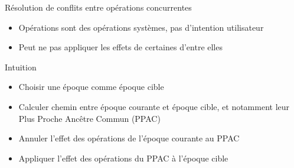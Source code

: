 \begin{frame}{Résolution de conflits entre opérations \ren concurrentes}
  \begin{itemize}
    \item Opérations \ren sont des opérations systèmes, \ie pas d'intention utilisateur
    \item Peut ne pas appliquer les effets de certaines d'entre elles
  \end{itemize}
  \begin{block}{Intuition}
    \begin{itemize}
      \item Choisir une époque comme époque cible
      \item Calculer chemin entre époque courante et époque cible, et notamment leur Plus Proche Ancêtre Commun (PPAC)
      \item Annuler l'effet des opérations \ren de l'époque courante au PPAC
      \item Appliquer l'effet des opérations \ren du PPAC à l'époque cible
    \end{itemize}
  \end{block}
\end{frame}

